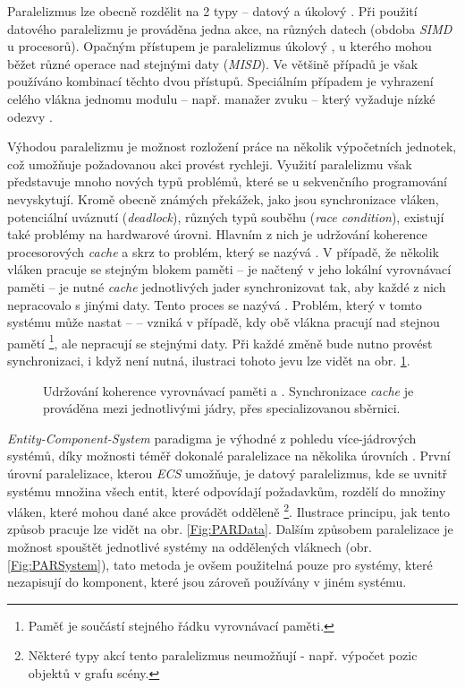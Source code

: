 Paralelizmus lze obecně rozdělit na 2 typy -- datový a úkolový \cite{KindsOfParallelism}. Při použití datového paralelizmu je prováděna jedna akce, na různých datech (obdoba \emph{SIMD} u procesorů). Opačným přístupem je paralelizmus úkolový \cite{TaskBasedParallelism}, u kterého mohou běžet různé operace nad stejnými daty (\emph{MISD}). Ve většině případů je však používáno kombinací těchto dvou přístupů. Speciálním případem je vyhrazení celého vlákna jednomu modulu -- např. manažer zvuku -- který vyžaduje nízké odezvy \cite{FrontierThreads}.

Výhodou paralelizmu je možnost rozložení práce na několik výpočetních jednotek, což umožňuje požadovanou akci provést rychleji. Využití paralelizmu však představuje mnoho nových typů problémů, které se u sekvenčního programování nevyskytují. Kromě obecně známých překážek, jako jsou synchronizace vláken, potenciální uváznutí (\emph{deadlock}), různých typů souběhu (\emph{race condition}), existují také problémy na hardwarové úrovni. Hlavním z nich je udržování koherence procesorových \emph{cache} \cite{CacheCoherence} a skrz to problém, který se nazývá  \cite{FalseSharing}. V případě, že několik vláken pracuje se stejným blokem paměti -- je načtený v jeho lokální vyrovnávací paměti -- je nutné \emph{cache} jednotlivých jader synchronizovat tak, aby každé z nich nepracovalo s jinými daty. Tento proces se nazývá . Problém, který v tomto systému může nastat --  -- vzniká v případě, kdy obě vlákna pracují nad stejnou pamětí \footnote{Paměť je součástí stejného řádku vyrovnávací paměti.}, ale nepracují se stejnými daty. Při každé změně bude nutno provést synchronizaci, i když není nutná, ilustraci tohoto jevu lze vidět na obr. \ref{Fig:PARFalseSharing}.

\begin{figure}
	\caption{Udržování koherence vyrovnávací paměti a  \cite{FalseSharing}. Synchronizace \emph{cache} je prováděna mezi jednotlivými jádry, přes specializovanou sběrnici.}
	\label{Fig:PARFalseSharing}
\end{figure}

\emph{Entity-Component-System} paradigma je výhodné z pohledu více-jádrových systémů, díky možnosti téměř \cite{AmdahlLaw} dokonalé paralelizace na několika úrovních \cite{ParallelGame}. První úrovní paralelizace, kterou \emph{ECS} umožňuje, je datový paralelizmus, kde se uvnitř systému množina všech entit, které odpovídají požadavkům, rozdělí do množiny vláken, které mohou dané akce provádět odděleně \footnote{Některé typy akcí tento paralelizmus neumožňují - např. výpočet pozic objektů v grafu scény.}. Ilustrace principu, jak tento způsob pracuje lze vidět na obr. \ref{Fig:PARData}. Dalším způsobem paralelizace je možnost spouštět jednotlivé systémy na oddělených vláknech (obr. \ref{Fig:PARSystem}), tato metoda je ovšem použitelná pouze pro systémy, které nezapisují do komponent, které jsou zároveň používány v jiném systému. 

